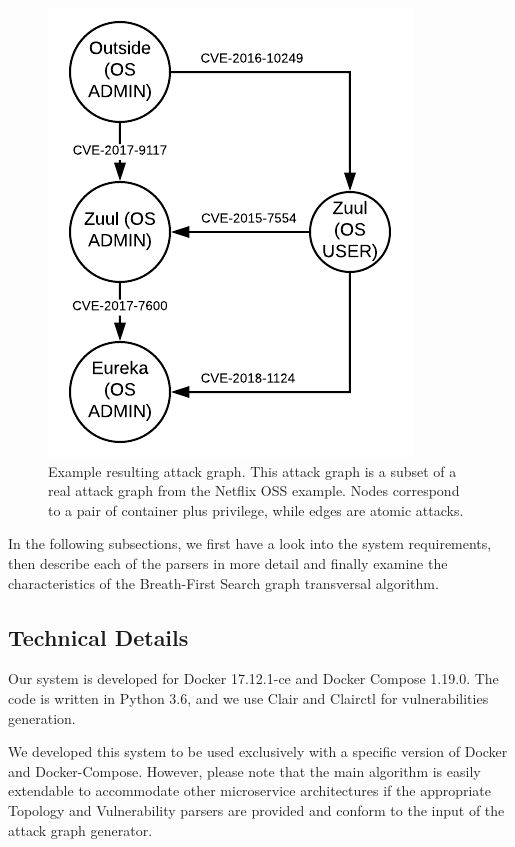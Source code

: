 \begin{figure}
	\includegraphics[]{./images/Attack_graph}
	\caption{Example resulting attack graph. This attack graph is a subset of a real attack graph from the Netflix OSS example. Nodes correspond to a pair of container plus privilege, while edges are atomic attacks.}
	\label{AttackGraph}
\end{figure}


In the following subsections, we first have a look into the system requirements, then describe each of the parsers in more detail and finally examine the characteristics of the Breath-First Search graph transversal algorithm.

\subsection{Technical Details}
\label{chap:technical}

Our system is developed for Docker 17.12.1-ce and Docker Compose 1.19.0. The code is written in Python 3.6, and we use Clair \cite{clair} and Clairctl \cite{clairctl} for vulnerabilities generation.

We developed this system to be used exclusively with a specific version of Docker and Docker-Compose. However, please note that the main algorithm is easily extendable to accommodate other microservice architectures if the appropriate Topology and Vulnerability parsers are provided and conform to the input of the attack graph generator.

